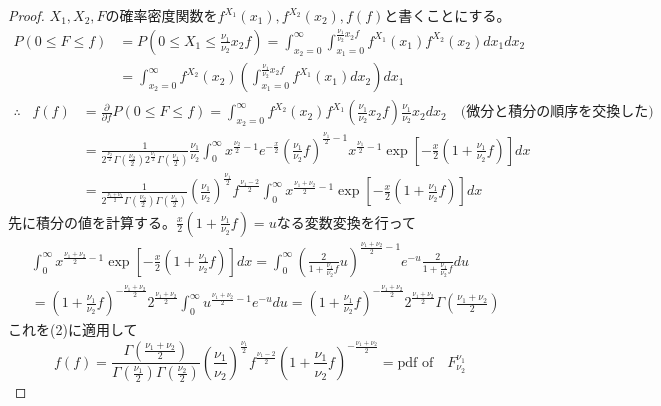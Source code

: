         \begin{proof}
            \quad\par
            $X_1,X_2,F$の確率密度関数を$f^{X_1}(x_1),f^{X_2}(x_2),f(f)$と書くことにする。
            \begin{align*}
                P(0 \leq F \leq f) &= P\left(0 \leq X_1 \leq \frac{\nu_1}{\nu_2}x_2f\right) = \int_{x_2=0}^{\infty}{\int_{x_1=0}^{\frac{\nu_1}{\nu_2}x_2f}{f^{X_1}(x_1)f^{X_2}(x_2) dx_1} dx_2}\\
                &= \int_{x_2=0}^{\infty}{f^{X_2}(x_2)\left(\int_{x_1=0}^{\frac{\nu_1}{\nu_2}x_2f}{f^{X_1}(x_1) dx_2}\right) dx_1}
            \end{align*}
            \begin{align}
                \therefore \;\;\; f(f) &= \frac{\partial}{\partial f}P(0 \leq F \leq f) = \int_{x_2=0}^{\infty}{f^{X_2}(x_2)f^{X_1}\left(\frac{\nu_1}{\nu_2}x_2f\right)\frac{\nu_1}{\nu_2}x_2 dx_2} \quad \text{(微分と積分の順序を交換した)} \nonumber \\
                &= \frac{1}{2^{\frac{\nu_2}{2}}\Gamma{\left(\frac{\nu_2}{2}\right)}2^{\frac{\nu_1}{2}}\Gamma{\left(\frac{\nu_1}{2}\right)}}\frac{\nu_1}{\nu_2}\int_{0}^{\infty}{x^{\frac{\nu_2}{2}-1}e^{-\frac{x}{2}}\left(\frac{\nu_1}{\nu_2}f\right)^{\frac{\nu_1}{2}-1}x^{\frac{\nu_1}{2}-1}\exp\left[-\frac{x}{2}\left(1+\frac{\nu_1}{\nu_2}f\right)\right] dx} \nonumber \\
                &=\frac{1}{2^{\frac{\nu_1+\nu_2}{2}}\Gamma{\left(\frac{\nu_2}{2}\right)}\Gamma{\left(\frac{\nu_1}{2}\right)}}\left(\frac{\nu_1}{\nu_2}\right)^\frac{\nu_1}{2}f^{\frac{\nu_1-2}{2}}\int_{0}^{\infty}{x^{\frac{\nu_1+\nu_2}{2}-1}\exp\left[-\frac{x}{2}\left(1+\frac{\nu_1}{\nu_2}f\right)\right] dx}
            \end{align}
            先に積分の値を計算する。$\displaystyle \frac{x}{2}\left(1+\frac{\nu_1}{\nu_2}f\right) = u$なる変数変換を行って
            \begin{align*}
                & \int_{0}^{\infty}{x^{\frac{\nu_1+\nu_2}{2}-1}\exp\left[-\frac{x}{2}\left(1+\frac{\nu_1}{\nu_2}f\right)\right] dx} = \int_{0}^{\infty}{\left(\frac{2}{1+\frac{\nu_1}{\nu_2}f}u\right)^{\frac{\nu_1+\nu_2}{2}-1}e^{-u}\frac{2}{1+\frac{\nu_1}{\nu_2}f} du}\\
                &= \left(1+\frac{\nu_1}{\nu_2}f\right)^{-\frac{\nu_1+\nu_2}{2}}2^{\frac{\nu_1+\nu_2}{2}}\int_{0}^{\infty}{u^{\frac{\nu_1+\nu_2}{2}-1}e^{-u} du} = \left(1+\frac{\nu_1}{\nu_2}f\right)^{-\frac{\nu_1+\nu_2}{2}}2^{\frac{\nu_1+\nu_2}{2}}\Gamma{\left(\frac{\nu_1+\nu_2}{2}\right)}
            \end{align*}
            これを(2)に適用して
            \[f(f) = \frac{\Gamma{\left(\frac{\nu_1+\nu_2}{2}\right)}}{\Gamma{\left(\frac{\nu_1}{2}\right)}\Gamma{\left(\frac{\nu_2}{2}\right)}}\left(\frac{\nu_1}{\nu_2}\right)^{\frac{\nu_1}{2}}f^{\frac{\nu_1-2}{2}}\left(1+\frac{\nu_1}{\nu_2}f\right)^{-\frac{\nu_1+\nu_2}{2}} = \text{pdf of} \quad F_{\nu_2}^{\nu_1}\]
        \end{proof}
